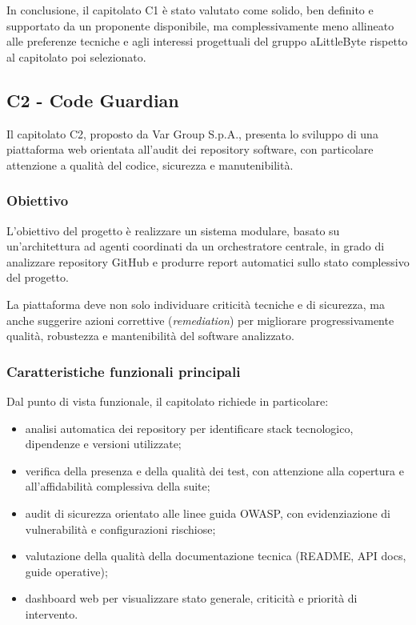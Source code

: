 \documentclass[a4paper,12pt]{article}
\begin{document}
In conclusione, il capitolato C1 è stato valutato come solido, ben definito e supportato da un proponente disponibile, ma complessivamente meno allineato alle preferenze tecniche e agli interessi progettuali del gruppo aLittleByte rispetto al capitolato poi selezionato.

\subsection{C2 - Code Guardian}

Il capitolato C2, proposto da Var Group S.p.A., presenta lo sviluppo di una piattaforma web orientata all'audit dei repository software, con particolare attenzione a qualità del codice, sicurezza e manutenibilità.

\subsubsection{Obiettivo}

L'obiettivo del progetto è realizzare un sistema modulare, basato su un'architettura ad agenti coordinati da un orchestratore centrale, in grado di analizzare repository GitHub e produrre report automatici sullo stato complessivo del progetto.

La piattaforma deve non solo individuare criticità tecniche e di sicurezza, ma anche suggerire azioni correttive (\textit{remediation}) per migliorare progressivamente qualità, robustezza e mantenibilità del software analizzato.

\subsubsection{Caratteristiche funzionali principali}

Dal punto di vista funzionale, il capitolato richiede in particolare:

\begin{itemize}
    \item analisi automatica dei repository per identificare stack tecnologico, dipendenze e versioni utilizzate;
    \item verifica della presenza e della qualità dei test, con attenzione alla copertura e all'affidabilità complessiva della suite;
    \item audit di sicurezza orientato alle linee guida OWASP, con evidenziazione di vulnerabilità e configurazioni rischiose;
    \item valutazione della qualità della documentazione tecnica (README, API docs, guide operative);
    \item dashboard web per visualizzare stato generale, criticità e priorità di intervento.
\end{itemize}
\end{document}
